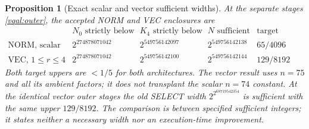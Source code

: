 \documentclass[11pt]{article}
\theoremstyle{plain}
\newtheorem{proposition}[theorem]{Proposition}
\theoremstyle{definition}
\theoremstyle{remark}
\begin{document}
\begin{proposition}[Exact scalar and vector sufficient widths]
\label{vqal:widths}
At the separate stages \eqref{vqal:outer}, the accepted NORM and VEC
enclosures are
\begin{equation}\label{vqal:headline}
 \begin{array}{c|c|c|c|c}
 &N_0\text{ strictly below}&K_4\text{ strictly below}
 &N\text{ sufficient}&\text{target upper}\\\hline
 \text{NORM, scalar}&2^{274878071042}&2^{549756142097}
 &2^{549756142138}&65/4096\\
 \text{VEC, }1\le r\le4&2^{274878071042}&2^{549756142100}
 &2^{549756142144}&129/8192
 \end{array}
\end{equation}
Both target uppers are $<1/5$ for both architectures. The vector result
uses $n=75$ and all its ambient factors; it does not transplant the
scalar $n=74$ constant. At the identical vector outer stages the old
SELECT width $2^{2^{68719542354}}$ is sufficient with the same upper
$129/8192$. The comparison is between specified sufficient integers;
it states neither a necessary width nor an execution-time improvement.
\end{proposition}
\end{document}
